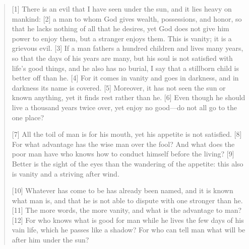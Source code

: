 \begin{quote}
    [1] There is an evil that I have seen under the sun, and it lies heavy on
    mankind: [2] a man to whom God gives wealth, possessions, and honor, so
    that he lacks nothing of all that he desires, yet God does not give him
    power to enjoy them, but a stranger enjoys them.  This is vanity; it is a
    grievous evil.  [3] If a man fathers a hundred children and lives many
    years, so that the days of his years are many, but his soul is not
    satisfied with life’s good things, and he also has no burial, I say that
    a stillborn child is better off than he.  [4] For it comes in vanity and
    goes in darkness, and in darkness its name is covered.  [5] Moreover, it
    has not seen the sun or known anything, yet it finds rest rather than he.
    [6] Even though he should live a thousand years twice over, yet enjoy no
    good—do not all go to the one place?

    [7] All the toil of man is for his mouth, yet his appetite is not
    satisfied.  [8] For what advantage has the wise man over the fool?  And
    what does the poor man have who knows how to conduct himself before the
    living?  [9] Better is the sight of the eyes than the wandering of the
    appetite: this also is vanity and a striving after wind.

    [10] Whatever has come to be has already been named, and it is known what
    man is, and that he is not able to dispute with one stronger than he.
    [11] The more words, the more vanity, and what is the advantage to man?
    [12] For who knows what is good for man while he lives the few days of
    his vain life, which he passes like a shadow?  For who can tell man what
    will be after him under the sun?
  \end{quote}
